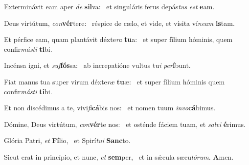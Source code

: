 \item Exterminávit eam aper \textit{de} \textbf{sil}va:~\psstar{} et singuláris ferus depás\textit{tus} \textit{est} \textbf{e}am.

\item Deus virtútum, \textit{con}\textbf{vér}tere:~\psstar{} réspice de cælo, et vide, et vísita ví\textit{neam} \textbf{is}tam.

\item Et pérfice eam, quam plantávit déxte\textit{ra} \textbf{tu}a:~\psstar{} et super fílium hóminis, quem confir\textit{másti} \textbf{ti}bi.

\item Incénsa igni, et \textit{suf}\textbf{fós}sa:~\psstar{} ab increpatióne vultus tu\textit{i} \textit{per}\textbf{í}bunt.

\item Fiat manus tua super virum déxte\textit{ræ} \textbf{tu}æ:~\psstar{} et super fílium hóminis quem confir\textit{másti} \textbf{ti}bi.

\item Et non discédimus a te, vivi\textit{fi}\textbf{cá}bis nos:~\psstar{} et nomen tuum \textit{invo}\textbf{cá}bimus.

\item Dómine, Deus virtútum, \textit{con}\textbf{vér}te nos:~\psstar{} et osténde fáciem tuam, et \textit{salvi} \textbf{é}rimus.

\item Glória Patri, \textit{et} \textbf{Fí}lio,~\psstar{} et Spirí\textit{tui} \textbf{Sanc}to.

\item Sicut erat in princípio, et nunc, \textit{et} \textbf{sem}per,~\psstar{} et in sǽcula sæcu\textit{lórum}. \textbf{A}men.